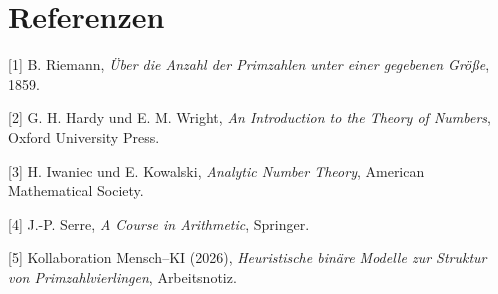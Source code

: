 \documentclass[11pt,a4paper,twocolumn]{article}
\theoremstyle{definition}
\theoremstyle{remark}
\begin{document}
	\section*{Referenzen}
	\small
	[1] B. Riemann, \textit{Über die Anzahl der Primzahlen unter einer gegebenen Größe}, 1859.
	
	[2] G. H. Hardy und E. M. Wright, \textit{An Introduction to the Theory of Numbers}, Oxford University Press.
	
	[3] H. Iwaniec und E. Kowalski, \textit{Analytic Number Theory}, American Mathematical Society.
	
	[4] J.-P. Serre, \textit{A Course in Arithmetic}, Springer.
	
	[5] Kollaboration Mensch--KI (2026), \textit{Heuristische binäre Modelle zur Struktur von Primzahlvierlingen}, Arbeitsnotiz.
	
\end{document}
